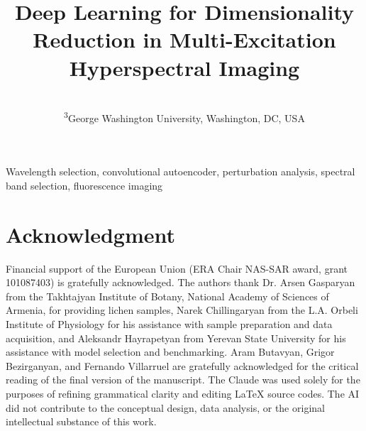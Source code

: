 \documentclass[journal]{IEEEtran}
\begin{document}
\title{Deep Learning for Dimensionality Reduction in Multi-Excitation Hyperspectral Imaging}

\author{

\\
\textsuperscript{3}George Washington University, Washington, DC, USA \\
}


\maketitle

% 
% 


% 
%
\begin{IEEEkeywords}
Wavelength selection, convolutional autoencoder, perturbation analysis, spectral band selection, fluorescence imaging
\end{IEEEkeywords}

%
%








% 
% 
\section*{Acknowledgment}
Financial support of the European Union (ERA Chair NAS-SAR award, grant 101087403) is gratefully acknowledged. The authors thank Dr. Arsen Gasparyan from the Takhtajyan Institute of Botany, National Academy of Sciences of Armenia, for providing lichen samples, Narek Chillingaryan from the L.A. Orbeli Institute of Physiology for his assistance with sample preparation and data acquisition, and Aleksandr Hayrapetyan from Yerevan State University for his assistance with model selection and benchmarking. Aram Butavyan, Grigor Bezirganyan, and Fernando Villarruel are gratefully acknowledged for the critical reading of the final version of the manuscript. The Claude was used solely for the purposes of refining grammatical clarity and editing LaTeX source codes. The AI did not contribute to the conceptual design, data analysis, or the original intellectual substance of this work.
\end{document}

